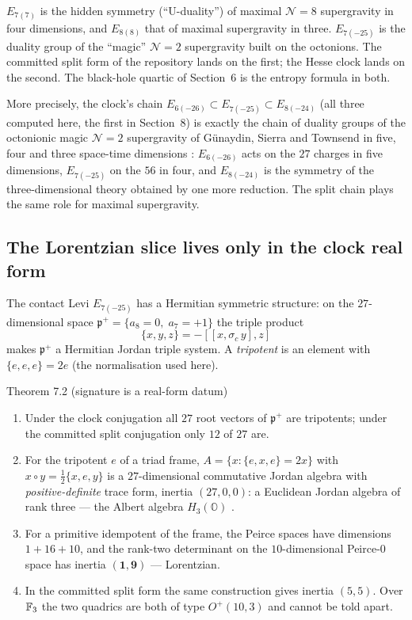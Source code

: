 \begin{physical}
$E_{7(7)}$ is the hidden symmetry (``U-duality'') of maximal $\mathcal N=8$ supergravity in
four dimensions, and $E_{8(8)}$ that of maximal supergravity in three. $E_{7(-25)}$ is the
duality group of the ``magic'' $\mathcal N=2$ supergravity built on the octonions. The
committed split form of the repository lands on the first; the Hesse clock lands on the
second. The black-hole quartic of Section~6 is the entropy formula in both.

More precisely, the clock's chain $E_{6(-26)}\subset E_{7(-25)}\subset E_{8(-24)}$ (all three
computed here, the first in Section~8) is exactly the chain of duality groups of the
octonionic magic $\mathcal N=2$ supergravity of G\"unaydin, Sierra and Townsend in five, four
and three space-time dimensions \cite{GST1983}: $E_{6(-26)}$ acts on the $27$ charges in five
dimensions, $E_{7(-25)}$ on the $56$ in four, and $E_{8(-24)}$ is the symmetry of the
three-dimensional theory obtained by one more reduction. The split chain plays the same role
for maximal supergravity. \tierB
\end{physical}

\subsection{The Lorentzian slice lives only in the clock real form}

The contact Levi $E_{7(-25)}$ has a Hermitian symmetric structure: on the $27$-dimensional
space $\mathfrak p^+=\{a_8=0,\;a_7=+1\}$ the triple product
\[
\{x,y,z\}=-[[x,\sigma_c\,y],z]
\]
makes $\mathfrak p^+$ a Hermitian Jordan triple system. A \emph{tripotent} is an element
with $\{e,e,e\}=2e$ (the normalisation used here).

\begin{result}{Theorem 7.2 (signature is a real-form datum) \hfill \tierC}
\begin{enumerate}[label=(\roman*),leftmargin=1.5em]
\item Under the clock conjugation all $27$ root vectors of $\mathfrak p^+$ are tripotents;
      under the committed split conjugation only $12$ of $27$ are.
\item For the tripotent $e$ of a triad frame, $A=\{x:\{e,x,e\}=2x\}$ with
      $x\circ y=\tfrac12\{x,e,y\}$ is a $27$-dimensional commutative Jordan algebra with
      \emph{positive-definite} trace form, inertia $(27,0,0)$: a Euclidean Jordan algebra
      of rank three --- the Albert algebra $H_3(\mathbb O)$ \cite{FarautKoranyi}.
\item For a primitive idempotent of the frame, the Peirce spaces have dimensions
      $1+16+10$, and the rank-two determinant on the $10$-dimensional Peirce-$0$ space has
      inertia $\mathbf{(1,9)}$ --- Lorentzian.
\item In the committed split form the same construction gives inertia $(5,5)$. Over $\mathbb{F}_3$
      the two quadrics are both of type $O^+(10,3)$ and cannot be told apart.
\end{enumerate}
\end{result}

